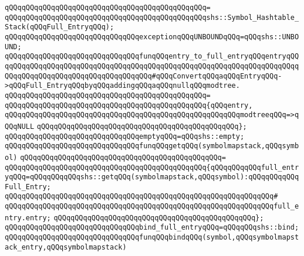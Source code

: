 \verb|qQQqqQQqqQQqqQQqqQQqqQQqqQQqqQQqqQQqqQQqqQQqqQQq=|\newline
\verb|qQQqqQQqqQQqqQQqqQQqqQQqqQQqqQQqqQQqqQQqqQQqqQQqshs::Symbol_Hashtable_Stack(qQQqFull_EntryqQQq);|\newline
\newline
\verb|qQQqqQQqqQQqqQQqqQQqqQQqqQQqqQQqexceptionqQQqUNBOUNDqQQq=qQQqshs::UNBOUND;|\newline
\newline
\verb|qQQqqQQqqQQqqQQqqQQqqQQqqQQqqQQqfunqQQqentry_to_full_entryqQQqentryqQQqqQQqqQQqqQQqqQQqqQQqqQQqqQQqqQQqqQQqqQQqqQQqqQQqqQQqqQQqqQQqqQQqqQQqqQQqqQQqqQQqqQQqqQQqqQQqqQQqqQQqqQQq#qQQqConvertqQQqaqQQqEntryqQQq->qQQqFull_EntryqQQqbyqQQqaddingqQQqaqQQqnullqQQqmodtree.|\newline
\verb|qQQqqQQqqQQqqQQqqQQqqQQqqQQqqQQqqQQqqQQqqQQqqQQq=|\newline
\verb|qQQqqQQqqQQqqQQqqQQqqQQqqQQqqQQqqQQqqQQqqQQqqQQq{qQQqentry,|\newline
\verb|qQQqqQQqqQQqqQQqqQQqqQQqqQQqqQQqqQQqqQQqqQQqqQQqqQQqqQQqmodtreeqQQq=>qQQqNULL|\newline
\verb|qQQqqQQqqQQqqQQqqQQqqQQqqQQqqQQqqQQqqQQqqQQqqQQq};|\newline
\newline
\verb|qQQqqQQqqQQqqQQqqQQqqQQqqQQqqQQqemptyqQQq=qQQqshs::empty;|\newline
\newline
\verb|qQQqqQQqqQQqqQQqqQQqqQQqqQQqqQQqfunqQQqgetqQQq(symbolmapstack,qQQqsymbol)|\newline
\verb|qQQqqQQqqQQqqQQqqQQqqQQqqQQqqQQqqQQqqQQqqQQqqQQq=|\newline
\verb|qQQqqQQqqQQqqQQqqQQqqQQqqQQqqQQqqQQqqQQqqQQqqQQq{qQQqqQQqqQQqfull_entryqQQq=qQQqqQQqqQQqshs::getqQQq(symbolmapstack,qQQqsymbol):qQQqqQQqqQQqFull_Entry;|\newline
\verb|qQQqqQQqqQQqqQQqqQQqqQQqqQQqqQQqqQQqqQQqqQQqqQQqqQQqqQQqqQQqqQQq#|\newline
\verb|qQQqqQQqqQQqqQQqqQQqqQQqqQQqqQQqqQQqqQQqqQQqqQQqqQQqqQQqqQQqqQQqfull_entry.entry;|\newline
\verb|qQQqqQQqqQQqqQQqqQQqqQQqqQQqqQQqqQQqqQQqqQQqqQQq};|\newline
\newline
\verb|qQQqqQQqqQQqqQQqqQQqqQQqqQQqqQQqbind_full_entryqQQq=qQQqqQQqshs::bind;|\newline
\newline
\verb|qQQqqQQqqQQqqQQqqQQqqQQqqQQqqQQqfunqQQqbindqQQq(symbol,qQQqsymbolmapstack_entry,qQQqsymbolmapstack)|\newline
